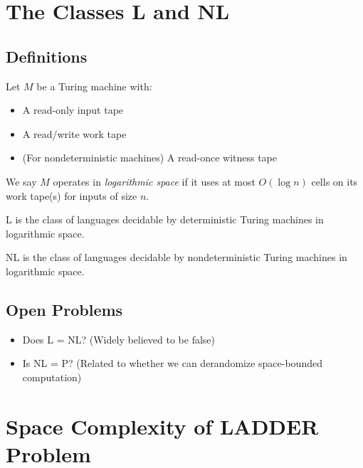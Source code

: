 \section{The Classes \textsf{L} and \textsf{NL}}

\subsection{Definitions}

\begin{definition}
Let $M$ be a Turing machine with:
\begin{itemize}
    \item A read-only input tape
    \item A read/write work tape
    \item (For nondeterministic machines) A read-once witness tape
\end{itemize}
We say $M$ operates in \emph{logarithmic space} if it uses at most $O(\log n)$ cells on its work tape(s) for inputs of size $n$.
\end{definition}

\begin{definition}
\textsf{L} is the class of languages decidable by deterministic Turing machines in logarithmic space.
\end{definition}

\begin{definition}
\textsf{NL} is the class of languages decidable by nondeterministic Turing machines in logarithmic space.
\end{definition}

\subsection{Open Problems}

\begin{itemize}
    \item Does \textsf{L} = \textsf{NL}? (Widely believed to be false)
    \item Is \textsf{NL} = \textsf{P}? (Related to whether we can derandomize space-bounded computation)
\end{itemize}

\section{Space Complexity of LADDER Problem}

